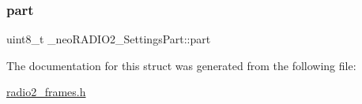 \subsubsection{\texorpdfstring{part}{part}}
{\footnotesize\ttfamily uint8\+\_\+t \+\_\+neo\+R\+A\+D\+I\+O2\+\_\+\+Settings\+Part\+::part}



The documentation for this struct was generated from the following file\+:\begin{DoxyCompactItemize}
\item 
\mbox{\hyperlink{radio2__frames_8h}{radio2\+\_\+frames.\+h}}\end{DoxyCompactItemize}
